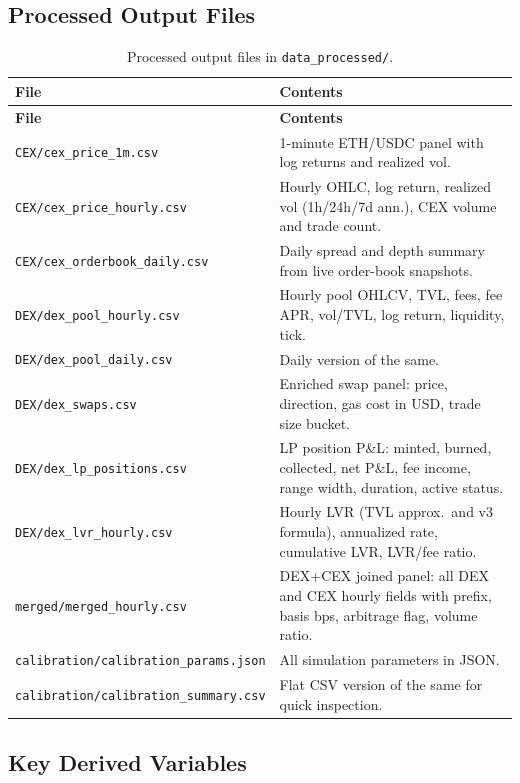 \documentclass[11pt,a4paper]{article}
\begin{document}
\subsection{Processed Output Files}

\begin{longtable}{L{5.8cm}L{8.6cm}}
\caption{Processed output files in \texttt{data\_processed/}.}\\
\toprule
\textbf{File} & \textbf{Contents} \\
\midrule
\endfirsthead
\toprule
\textbf{File} & \textbf{Contents} \\
\midrule
\endhead
\bottomrule
\endfoot
\texttt{CEX/cex\_price\_1m.csv} & 1-minute ETH/USDC panel with log returns and realized vol. \\
\texttt{CEX/cex\_price\_hourly.csv} & Hourly OHLC, log return, realized vol (1h/24h/7d ann.), CEX volume and trade count. \\
\texttt{CEX/cex\_orderbook\_daily.csv} & Daily spread and depth summary from live order-book snapshots. \\
\texttt{DEX/dex\_pool\_hourly.csv} & Hourly pool OHLCV, TVL, fees, fee APR, vol/TVL, log return, liquidity, tick. \\
\texttt{DEX/dex\_pool\_daily.csv} & Daily version of the same. \\
\texttt{DEX/dex\_swaps.csv} & Enriched swap panel: price, direction, gas cost in USD, trade size bucket. \\
\texttt{DEX/dex\_lp\_positions.csv} & LP position P\&L: minted, burned, collected, net P\&L, fee income, range width, duration, active status. \\
\texttt{DEX/dex\_lvr\_hourly.csv} & Hourly LVR (TVL approx.\ and v3 formula), annualized rate, cumulative LVR, LVR/fee ratio. \\
\texttt{merged/merged\_hourly.csv} & DEX+CEX joined panel: all DEX and CEX hourly fields with prefix, basis bps, arbitrage flag, volume ratio. \\
\texttt{calibration/calibration\_params.json} & All simulation parameters in JSON. \\
\texttt{calibration/calibration\_summary.csv} & Flat CSV version of the same for quick inspection. \\
\end{longtable}

\subsection{Key Derived Variables}
\end{document}
